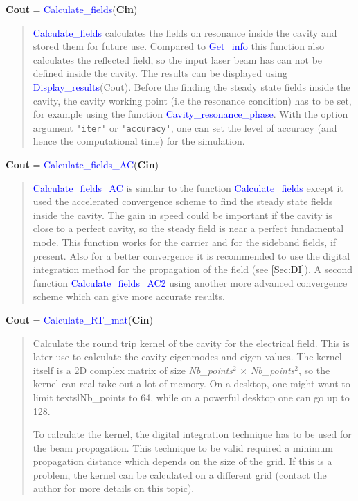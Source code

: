 \noindent \textbf{Cout} = \textcolor{blue}{Calculate\_fields}(\textbf{Cin})
\vspace*{-0.2cm}
\begin{quote}
\textcolor{blue}{Calculate\_fields} calculates the fields on resonance inside the cavity and stored them for future use. Compared to \textcolor{blue}{Get\_info} this function also calculates the reflected field, so the input laser beam has can not be defined inside the cavity. The results can be displayed using \textcolor{blue}{Display\_results}(Cout).
Before the finding the steady state fields inside the cavity, the cavity working point (i.e the resonance condition) has to be set, for example using the function \textcolor{blue}{Cavity\_resonance\_phase}.
With the option argument \verb?'iter'? or \verb?'accuracy'?, one can set the level of accuracy (and hence the computational time) for the simulation.
\end{quote}

\noindent \textbf{Cout} = \textcolor{blue}{Calculate\_fields\_AC}(\textbf{Cin})
\vspace*{-0.2cm}
\begin{quote}
\textcolor{blue}{Calculate\_fields\_AC} is similar to the function \textcolor{blue}{Calculate\_fields} except it used the accelerated convergence scheme \cite{Saha:97,DAY_AC} to find the steady state fields inside the cavity. The gain in speed could be important if the cavity is close to a perfect cavity, so the steady field is near a perfect fundamental mode.
This function works for the carrier and for the sideband fields, if present. Also for a better convergence it is recommended to use the digital integration method for the propagation of the field (see \ref{Sec:DI}).
A second function \textcolor{blue}{Calculate\_fields\_AC2} using another more advanced convergence scheme which can give more accurate results.
\end{quote}

\noindent \textbf{Cout} = \textcolor{blue}{Calculate\_RT\_mat}(\textbf{Cin})
\vspace*{-0.2cm}
\begin{quote}
Calculate the round trip kernel of the cavity for the electrical field. This is later use to calculate the cavity eigenmodes and eigen values. The kernel itself is a 2D complex matrix of size \textsl{Nb\_points}$^2$ $\times$ \textsl{Nb\_points}$^2$, so the kernel can real take out a lot of memory. On a desktop, one might want to limit textsl{Nb\_points} to 64, while on a powerful desktop one can go up to 128.

To calculate the kernel, the digital integration technique has to be used for the beam propagation. This technique to be valid required a minimum propagation distance which depends on the size of the grid. If this is a problem, the kernel can be calculated on a different grid (contact the author for more details on this topic).
\end{quote}

